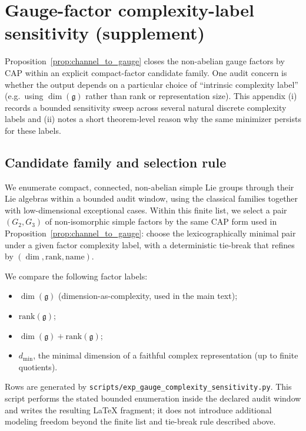 \section{Gauge-factor complexity-label sensitivity (supplement)}
\label{app:gauge_complexity_sensitivity}

Proposition~\ref{prop:channel_to_gauge} closes the non-abelian gauge factors by CAP within an explicit compact-factor candidate family.
One audit concern is whether the output depends on a particular choice of ``intrinsic complexity label'' (e.g.\ using $\dim(\mathfrak{g})$ rather than rank or representation size).
This appendix (i) records a bounded sensitivity sweep across several natural discrete complexity labels and (ii) notes a short theorem-level reason why the same minimizer persists for these labels.

\subsection{Candidate family and selection rule}
We enumerate compact, connected, non-abelian simple Lie groups through their Lie algebras within a bounded audit window, using the classical families together with low-dimensional exceptional cases.
Within this finite list, we select a pair $(G_2,G_3)$ of non-isomorphic simple factors by the same CAP form used in Proposition~\ref{prop:channel_to_gauge}: choose the lexicographically minimal pair under a given factor complexity label, with a deterministic tie-break that refines by $(\dim, \mathrm{rank}, \text{name})$.

We compare the following factor labels:
\begin{itemize}
\item $\dim(\mathfrak{g})$ (dimension-as-complexity, used in the main text);
\item $\mathrm{rank}(\mathfrak{g})$;
\item $\dim(\mathfrak{g})+\mathrm{rank}(\mathfrak{g})$;
\item $d_{\min}$, the minimal dimension of a faithful complex representation (up to finite quotients).
\end{itemize}

Rows are generated by \texttt{scripts/exp\_gauge\_complexity\_sensitivity.py}.
This script performs the stated bounded enumeration inside the declared audit window and writes the resulting \LaTeX{} fragment; it does not introduce additional modeling freedom beyond the finite list and tie-break rule described above.

